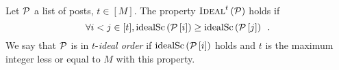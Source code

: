 \begin{definition}
  Let $\mathcal{P}$ a list of posts, $t \in [M]$. The property
  $\textsc{Ideal}^{t}\left(\mathcal{P}\right)$ holds if
  \begin{equation*}
    \forall i < j \in [t], \mathrm{idealSc}\left(\mathcal{P}\left[i\right]\right) \geq
    \mathrm{idealSc}\left(\mathcal{P}\left[j\right]\right) \enspace.
  \end{equation*}
  We say that $\mathcal{P}$ is in $t$-\emph{ideal order} if
  $\mathrm{idealSc}\left(\mathcal{P}\left[i\right]\right)$ holds and $t$ is the maximum integer less or
  equal to $M$ with this property.

\end{definition}
